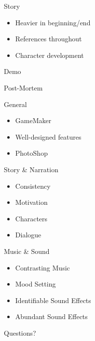 \documentclass{../teamepsilon}
\begin{document}
\begin{frame}{Story}
    \begin{itemize}
        \item Heavier in beginning/end
        \item References throughout
        \item Character development
    \end{itemize}
\end{frame}


\begin{frame}[standout]
    \Huge
    Demo
\end{frame}

\begin{frame}[standout]
    \Huge
    Post-Mortem
\end{frame}


\begin{frame}{General}
    \begin{itemize}
        \item GameMaker
        \item Well-designed features
        \item PhotoShop
    \end{itemize}
\end{frame}

\begin{frame}{Story \& Narration}
    \begin{itemize}
        \item Consistency
        \item Motivation
        \item Characters
        \item Dialogue
    \end{itemize}
\end{frame}

\begin{frame}{Music \& Sound}
    \begin{itemize}
        \item Contrasting Music
        \item Mood Setting
        \item Identifiable Sound Effects
        \item Abundant Sound Effects
    \end{itemize}
\end{frame}

\begin{frame}[standout]
    \Huge
    Questions?
\end{frame}
\end{document}
